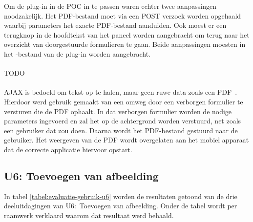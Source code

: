 Om de plug-in in de POC in te passen waren echter twee aanpassingen noodzakelijk.
Het PDF-bestand moet via een POST verzoek worden opgehaald waarbij parameters het exacte PDF-bestand aanduiden.
Ook moest er een terugknop in de hoofdtekst van het paneel worden aangebracht om terug naar het overzicht van doorgestuurde formulieren te gaan.
Beide aanpassingen moesten in het \js-bestand van de plug-in worden aangebracht.

\paragraph{\kendo}
TODO

\paragraph{\lungo}
AJAX is bedoeld om tekst op te halen, maar geen ruwe data zoals een PDF~\cite{Scott2009}. 
Hierdoor werd gebruik gemaakt van een omweg door een verborgen formulier te versturen die de PDF ophaalt.
In dat verborgen formulier worden de nodige parameters ingevoerd en zal het op de achtergrond  worden verstuurd, net zoals een gebruiker dat zou doen.
Daarna wordt het PDF-bestand gestuurd naar de gebruiker.
Het weergeven van de PDF wordt overgelaten aan het mobiel apparaat dat de correcte applicatie hiervoor opstart.

\subsection{U6: Toevoegen van afbeelding}
In tabel \ref{tabel:evaluatie-gebruik-u6} worden de resultaten getoond van de drie deeluitdagingen van U6:~Toevoegen van afbeelding.
Onder de tabel wordt per raamwerk verklaard waarom dat resultaat werd behaald.

\begin{table}[H]
\centering
{}
\caption{Gebruik voor U6: Toevoegen van afbeelding}
\label{tabel:evaluatie-gebruik-u6}
\end{table}

